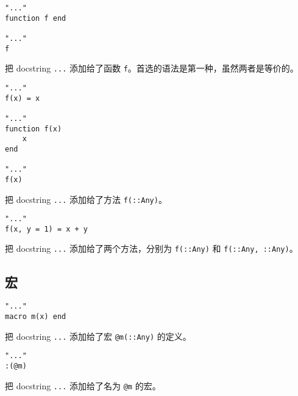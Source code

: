 \begin{verbatim}
"..."
function f end

"..."
f
\end{verbatim}



把 docstring \texttt{{\textquotedbl}...{\textquotedbl}} 添加给了函数 \texttt{f}。首选的语法是第一种，虽然两者是等价的。




\begin{verbatim}
"..."
f(x) = x

"..."
function f(x)
    x
end

"..."
f(x)
\end{verbatim}



把 docstring \texttt{{\textquotedbl}...{\textquotedbl}} 添加给了方法 \texttt{f(::Any)}。




\begin{verbatim}
"..."
f(x, y = 1) = x + y
\end{verbatim}



把 docstring \texttt{{\textquotedbl}...{\textquotedbl}} 添加给了两个方法，分别为 \texttt{f(::Any)} 和 \texttt{f(::Any, ::Any)}。



\hypertarget{958098821246331521}{}


\subsection{宏}




\begin{verbatim}
"..."
macro m(x) end
\end{verbatim}



把 docstring \texttt{{\textquotedbl}...{\textquotedbl}} 添加给了宏 \texttt{@m(::Any)} 的定义。




\begin{verbatim}
"..."
:(@m)
\end{verbatim}



把 docstring \texttt{{\textquotedbl}...{\textquotedbl}} 添加给了名为 \texttt{@m} 的宏。



\hypertarget{5145884598618557277}{}



